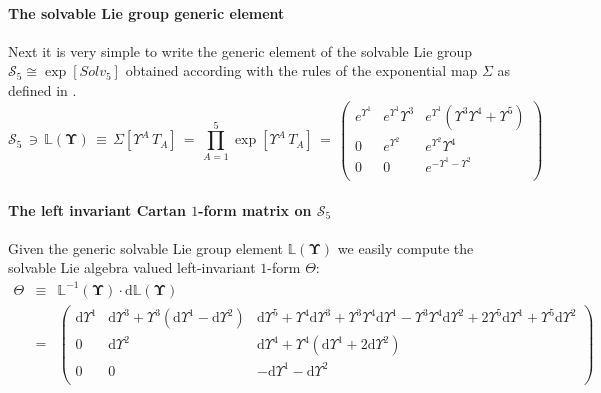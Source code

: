 \documentclass[10pt,a4paper]{article}
\begin{document}
\paragraph{The solvable Lie group generic element}
Next it is very simple to write the generic element of  the solvable Lie group $\mathcal{S}_5 \cong \exp[Solv_5]$ obtained according with the rules of the exponential map $\Sigma$ as defined in \cite{TSnaviga,pgtstheory}.
\begin{equation}\label{cromagnone}
 \mathcal{S}_5 \, \ni \, \mathbb{L}(\boldsymbol{\Upsilon})\, \equiv\, \Sigma[\Upsilon^A \, T_A ] \, = \, \prod_{A=1}^5 \exp\left[\Upsilon^A\, T_A \right] \, = \, \left(
\begin{array}{ccc}
 e^{\Upsilon^1} & e^{\Upsilon^1} \Upsilon^3 &
   e^{\Upsilon^1} \left(\Upsilon^3 \Upsilon^4+\Upsilon
   ^5\right) \\
 0 & e^{\Upsilon^2} & e^{\Upsilon^2} \Upsilon^4 \\
 0 & 0 & e^{-\Upsilon^1-\Upsilon^2} \\
\end{array}
\right)
\end{equation}
\paragraph{The left invariant Cartan $1$-form matrix on $\mathcal{S}_5$}
Given the generic solvable Lie group element $\mathbb{L}(\boldsymbol{\Upsilon})$ we easily compute the solvable Lie algebra valued
left-invariant $1$-form $\Theta$:
\begin{eqnarray}\label{carlinga}
\Theta & \equiv  &\mathbb{L}^{-1}(\boldsymbol{\Upsilon})\cdot \mathrm{d}\mathbb{L}(\boldsymbol{\Upsilon})\nonumber \\
  &=&\left(
\begin{array}{ccc}
 \mathrm{d}\Upsilon^1 & \mathrm{d}\Upsilon^3+\Upsilon^3 (\mathrm{d}\Upsilon
  ^1-\mathrm{d}\Upsilon^2) & \mathrm{d}\Upsilon^5+\Upsilon^4
   \mathrm{d}\Upsilon^3+\Upsilon^3 \Upsilon^4 \mathrm{d}\Upsilon
   ^1-\Upsilon^3 \Upsilon^4 \mathrm{d}\Upsilon^2+2
   \Upsilon^5 \mathrm{d}\Upsilon^1+\Upsilon^5 \mathrm{d}\Upsilon
   ^2 \\
 0 & \mathrm{d}\Upsilon^2 & \mathrm{d}\Upsilon^4+\Upsilon^4
   (\mathrm{d}\Upsilon^1+2 \mathrm{d}\Upsilon^2) \\
 0 & 0 & -\mathrm{d}\Upsilon^1-\mathrm{d}\Upsilon^2 \\
\end{array}
\right)
\end{eqnarray}
\end{document}
